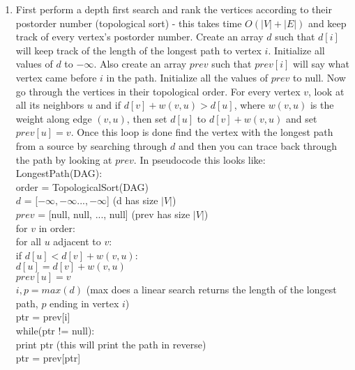\documentclass{article}
\begin{document}
\begin{enumerate}
	\item First perform a depth first search and rank the vertices according to their postorder number (topological sort) - this takes time $O(|V|+|E|)$ and keep track of every vertex's postorder number. Create an array $d$ such that $d[i]$ will keep track of the length of the longest path to vertex $i$. Initialize all values of $d$ to $-\infty$.  Also create an array $prev$ such that $prev[i]$ will say what vertex came before $i$ in the path. Initialize all the values of $prev$ to null.  Now go through the vertices in their topological order.  For every vertex $v$, look at all its neighbors $u$ and if $d[v] + w(v,u) > d[u]$, where $w(v,u)$ is the weight along edge $(v,u)$, then set $d[u]$ to $d[v] + w(v,u)$ and set $prev[u] = v$.  Once this loop is done find the vertex with the longest path from a source by searching through $d$ and then you can trace back through the path by looking at $prev$.  In pseudocode this looks like: \\
	LongestPath(DAG): \\
	\hspace*{0.5 in} order = TopologicalSort(DAG) \\
	\hspace*{0.5 in} $d$ = [$-\infty, -\infty...,-\infty$] (d has size $|V|$)\\
	\hspace*{0.5 in} $prev$ = [null, null, ..., null] (prev has size $|V|$) \\
	\hspace*{0.5 in} for $v$ in order: \\
	\hspace*{1.0 in}	for all $u$ adjacent to $v$: \\
	\hspace*{1.5 in}		if $d[u] < d[v] + w(v,u)$: \\
	\hspace*{2.0 in}			$d[u] = d[v] + w(v,u)$ \\
	\hspace*{2.0 in}			$prev[u] = v$ \\
	\hspace*{0.5 in} $i,p = max(d)$ (max does a linear search returns the length of the longest path, $p$ ending in vertex $i$) \\
	\hspace*{0.5 in} ptr = prev[i] \\
	\hspace*{0.5 in} while(ptr != null): \\
	\hspace*{1.0 in} 	print ptr (this will print the path in reverse) \\
	\hspace*{1.0 in} 	ptr = prev[ptr] \\
	

\end{enumerate}
\end{document}
